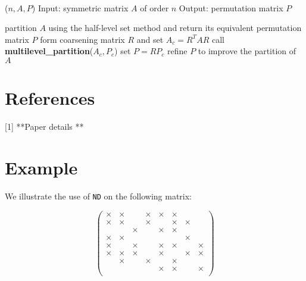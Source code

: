 \vspace{0.5cm}
\noindent\hrulefill\\
\vspace{-1.0em}
\begin{algorithmic}
($n,A,P$)
\STATE Input: symmetric matrix $A$ of order $n$
\STATE Output: permutation matrix $P$

\STATE partition $A$ using the half-level set method and return its equivalent permutation matrix $P$ 
\ELSE
\STATE form coarsening matrix $R$ and set $A_c = R^T A R$
\STATE call {\bf multilevel\_partition}($A_c,P_c$)
\STATE set $P = RP_c$
\STATE refine $P$ to improve the partition of $A$
\ENDIF

\end{algorithmic}
\noindent\hrulefill


\section*{References}
[1] **Paper details **




\section{Example}

We illustrate the use of {\tt ND} on the following matrix: 

$$
	\left(\begin{array}{cccccccc}
   \times &  \times  &         &  \times  &  \times  & \times &          &           \\
   \times &  \times  &         &  \times  &          & \times &  \times  &           \\ 
          &          & \times  &          &  \times  & \times &          &           \\
   \times &  \times  &         &          &          &        &  \times  &           \\ 
   \times &          & \times  &          &  \times  & \times &          &   \times  \\ 
   \times &  \times  & \times  &          &  \times  &        &  \times  &   \times  \\ 
          &  \times  &         &  \times  &          & \times &          &           \\ 
          &          &         &          &  \times  & \times &          &   \times  \\ 
	\end{array}\right)
$$


